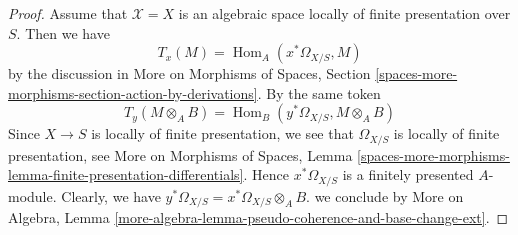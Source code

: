 \documentclass[10pt,a4paper]{amsart}
\theoremstyle{plain}
\theoremstyle{definition}
\theoremstyle{remark}
\numberwithin{equation}{subsection}
\def\Hom{\mathop{\mathrm{Hom}}\nolimits}
\begin{document}
\begin{proof}
\medskip\noindent
Assume that $\mathcal{X} = X$ is an algebraic space locally of finite
presentation over $S$. Then we have
$$
T_x(M) = \Hom_A(x^*\Omega_{X/S}, M)
$$
by the discussion in More on Morphisms of Spaces, Section
\ref{spaces-more-morphisms-section-action-by-derivations}.
By the same token
$$
T_y(M \otimes_A B) = \Hom_B(y^*\Omega_{X/S}, M \otimes_A B)
$$
Since $X \to S$ is locally of finite presentation, we see that
$\Omega_{X/S}$ is locally of finite presentation, see
More on Morphisms of Spaces, Lemma
\ref{spaces-more-morphisms-lemma-finite-presentation-differentials}.
Hence $x^*\Omega_{X/S}$ is a finitely presented $A$-module.
Clearly, we have $y^*\Omega_{X/S} = x^*\Omega_{X/S} \otimes_A B$.
we conclude by More on Algebra, Lemma
\ref{more-algebra-lemma-pseudo-coherence-and-base-change-ext}.
\end{proof}
\end{document}
